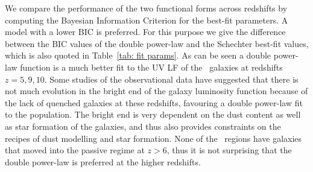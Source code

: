 We compare the performance of the two functional forms across redshifts by computing the Bayesian Information Criterion \citep[BIC, see][and references therein for further details; also see Appendix~\ref{app: lum_func}]{Schwarz1978,Liddle2007} for the best-fit parameters. 
A model with a lower BIC is preferred. For this purpose we give the difference between the BIC values of the double power-law and the Schechter best-fit values, which is also quoted in Table~\ref{tab: fit params}. As can be seen a double power-law function is a much better fit to the UV LF of the \flares\, galaxies at redshifts $z=5,9,10$. Some studies of the observational data \citep[\eg][]{Bowler2014,Bowler2020} have suggested that there is not much evolution in the bright end of the galaxy luminosity function because of the lack of quenched galaxies at these redshifts, favouring a double power-law fit to the population. The bright end is very dependent on the dust content as well as star formation of the galaxies, and thus also provides constraints on the recipes of dust modelling and star formation. None of the \flares\, regions have galaxies that moved into the passive regime at $z>6$, thus it is not surprising that the double power-law is preferred at the higher redshifts. 


